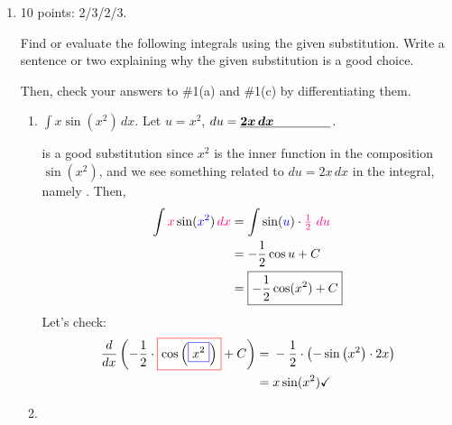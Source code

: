 \documentclass{article}
\begin{document}
\begin{enumerate}
\item 

\begin{grading}
10 points: 2/3/2/3.
\end{grading}




  Find or evaluate the following integrals using the given substitution.  Write a sentence or two explaining why the given substitution is a good choice. 
  
  Then, check your answers to {{{{\#1}}(a)}} and
  {{{{\#1}}(c)}} by differentiating them.

  \begin{enumerate}[topsep=0pt]
  \item
\begin{problem}[\vfill]
      $\displaystyle \int x \sin (x^2)\,dx$. Let $u = x^2$, 
      $du = \fitb{1in}{2x\,dx}$.
    \end{problem}

    \begin{solution}
       is a good substitution since $x^2$ is the inner
      function in the composition $\sin(x^2)$, and we see something
      related to $du = 2x\,dx$ in the integral, namely
      .  Then,
      \begin{align*}
        \int \subd{x} \sin(\sub{x^2})\, \subd{dx} &= \int \sin(\sub{u}) \cdot
        \subd{\tfrac{1}{2}\ du} \\
        &= - \frac{1}{2} \cos u + C \\
        &= \boxed{- \frac{1}{2} \cos(x^2) + C}
      \end{align*}
      Let's check:
      \begin{align*}
        \frac{d}{dx} \left(-\frac{1}{2}\cdot \fcolorbox{red}{white}{$\displaystyle
            \cos \left(\fcolorbox{blue}{white}{$\displaystyle x^ {2}
                $}\right)$} + C \right)  
        = {} & -\frac{1}{2}\cdot \left(-\sin \left(x^ {2} \right)\cdot
          2 x\right) \\
        = {} & x \sin(x^2) \checkmark
      \end{align*}
    \end{solution}

  \item



\end{enumerate}
\end{enumerate}
\end{document}
